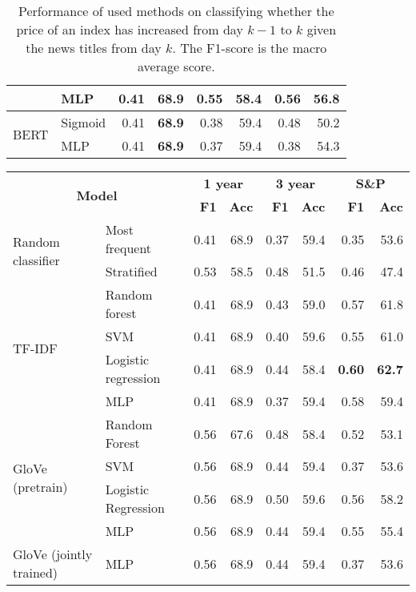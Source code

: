 \begin{table}[H]
\begin{tabular}{llrrrrrr}
        & MLP & 0.41 & \textbf{68.9} & 0.55 & 58.4 & 0.56 & 56.8 \\
        \hline
        \multirow{2}{*}{BERT} & Sigmoid & 0.41 & \textbf{68.9} & 0.38 & 59.4 & 0.48 & 50.2 \\
        & MLP & 0.41 & \textbf{68.9} & 0.37 & 59.4 & 0.38 & 54.3 \\ 
        \hline
    \end{tabular}
\caption{Performance of used methods on classifying whether the price of an index has increased from day $k-1$ to $k$ given the news titles from day $k$. The F1-score is the macro average score.}
\label{tab:rescdp}
\end{table}

\begin{table}[H]
    \centering
    \begin{tabular}{llrrrrrr}
    \hline
        \multicolumn{2}{c}{\multirow{2}{*}{\textbf{Model}}} & \multicolumn{2}{c}{\textbf{1 year}} & \multicolumn{2}{c}{\textbf{3 year}} & \multicolumn{2}{c}{\textbf{S\&P}} \\
      & & \textbf{F1} & \textbf{Acc} & \textbf{F1} & \textbf{Acc} & \textbf{F1} & \textbf{Acc} \\
        \hline \hline   
        \multirow{2}{*}{Random classifier} & Most frequent & 0.41 & 68.9 & 0.37 & 59.4 & 0.35 & 53.6 \\
        & Stratified & 0.53 & 58.5 & 0.48 & 51.5 & 0.46 & 47.4 \\
        \hline 
        \multirow{4}{*}{TF-IDF} & Random forest & 0.41 & 68.9 & 0.43 & 59.0 & 0.57 & 61.8 \\
        & SVM & 0.41 & 68.9 & 0.40 & 59.6 & 0.55 & 61.0 \\
        & Logistic regression & 0.41 & 68.9 & 0.44 & 58.4 & \textbf{0.60} & \textbf{62.7} \\
        & MLP & 0.41 & 68.9 & 0.37 & 59.4 & 0.58 & 59.4 \\
        \hline 
        \multirow{4}{*}{GloVe (pretrain)} & Random Forest & 0.56 & 67.6 & 0.48 & 58.4 & 0.52 & 53.1 \\
        & SVM & 0.56 & 68.9 & 0.44 & 59.4 & 0.37 & 53.6 \\
        & Logistic Regression & 0.56 & 68.9 & 0.50 & 59.6 & 0.56 & 58.2 \\
        & MLP & 0.56 & 68.9 & 0.44 & 59.4 & 0.55 & 55.4 \\
        \hline 
        \multirow{2}{*}{GloVe (jointly trained)} & MLP & 0.56 & 68.9 & 0.44 & 59.4 & 0.37 & 53.6 \\

\end{tabular}
\end{table}
